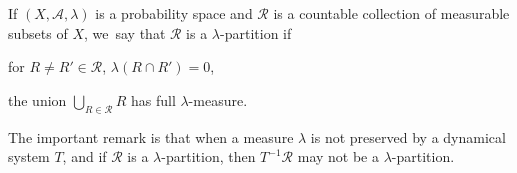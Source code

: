 \begin{definition}
If $(X, \mathcal{A},\lambda)$ is a probability space and $\mathcal{R}$ is a countable collection of measurable subsets of $X$, we~say that $\mathcal{R}$ is a $\lambda$-partition if
\begin{enumeratei}
\item
 for $R \neq R' \in \mathcal{R}$, $\lambda(R \cap R') = 0$,
\item
 the union $\bigcup_{R \in \mathcal{R}} R$ has full $\lambda$-measure.
\end{enumeratei}
\end{definition}

The important remark is that when a measure $\lambda$ is not preserved by a dynamical system $T$, and if $\mathcal{R}$ is a $\lambda$-partition, then $T^{-1} \mathcal{R}$ may not be a $\lambda$-partition.

